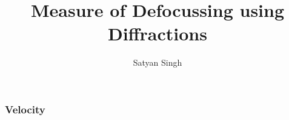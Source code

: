 
\title[]{Measure of Defocussing using Diffractions}
\subtitle{}
\author[]{Satyan Singh}
\date{}
\logo{}
\Large

\def\big#1{\begin{center} \LARGE \textbf{#1} \end{center}}
\def\cen#1{\begin{center}        \textbf{#1} \end{center}}

 { \cwpcover }

\begin{frame} \frametitle{Velocity}
\end{frame}
\cwpnote{}


